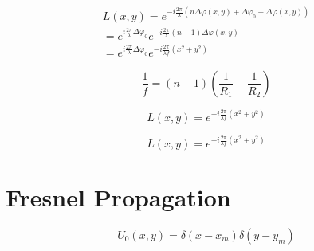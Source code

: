 \documentclass{kepfl}
\begin{document}
\begin{equation}
	\begin{array}{c}
L(x,y) = {e^{ - i\frac{{2\pi }}{\lambda }\left( {n\Delta \varphi (x,y) + \Delta {\varphi _0} - \Delta \varphi (x,y)} \right)}}\\
 = {e^{i\frac{{2\pi }}{\lambda }\Delta {\varphi _0}}}{e^{ - i\frac{{2\pi }}{\lambda }(n - 1)\Delta \varphi (x,y)}}\\
 = {e^{i\frac{{2\pi }}{\lambda }\Delta {\varphi _0}}}{e^{ - i\frac{{2\pi }}{{\lambda f}}({x^2} + {y^2})}}
\end{array}
\end{equation}


\begin{equation}
\frac{1}{f} = (n - 1)\left( {\frac{1}{{{R_1}}} - \frac{1}{{{R_2}}}} \right)	
\end{equation}

\begin{equation}
L(x,y) = {e^{ - i\frac{{2\pi }}{{\lambda f}}({x^2} + {y^2})}}
\end{equation}

\begin{equation}	
L(x,y) = {e^{ - i\frac{{2\pi }}{{\lambda f}}({x^2} + {y^2})}}
\end{equation}

\section{Fresnel Propagation}
\begin{equation}
	{U_0}(x,y) = \delta (x - {x_m})\delta (y - {y_m})
\end{equation}
\end{document}

